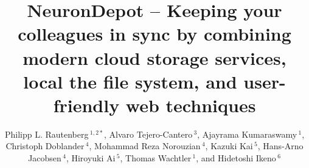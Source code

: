 \documentclass{frontiersSCNS} %
\def\firstAuthorLast{Rautenberg {et~al.}} %
\def\Authors{
Philipp L. Rautenberg\,$^{1,2*}$,
Alvaro Tejero-Cantero\,$^{3}$,
Ajayrama Kumaraswamy\,$^{1}$,
Christoph Doblander\,$^{4}$,
Mohammad Reza Norouzian\,$^{4}$,
Kazuki Kai\,$^{5}$,
Hans-Arno Jacobsen\,$^{4}$,
Hiroyuki Ai\,$^{5}$,
Thomas Wachtler\,$^{1}$,
and Hidetoshi Ikeno\,$^6$}
\begin{document}
\onecolumn
{}

\title[NeuronDepot – Keeping your colleagues in sync]{NeuronDepot – Keeping your colleagues in sync by combining modern cloud storage services, local the file system, and user-friendly web techniques}
\author[\firstAuthorLast ]{\Authors}
\address{}
\correspondance{}
\extraAuth{}%

\maketitle

\end{document}
